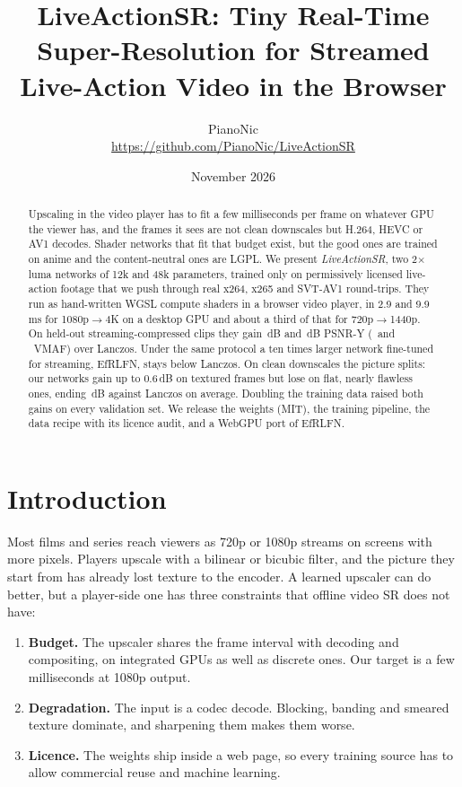 \documentclass[10pt,twocolumn,letterpaper]{article}
\title{\textbf{LiveActionSR: Tiny Real-Time Super-Resolution for Streamed Live-Action Video in the Browser}}
\author{PianoNic\\{\small\url{https://github.com/PianoNic/LiveActionSR}}}
\date{November 2026}
\begin{document}
\maketitle

\begin{abstract}
Upscaling in the video player has to fit a few milliseconds per frame on whatever GPU the viewer
has, and the frames it sees are not clean downscales but H.264, HEVC or AV1 decodes. Shader
networks that fit that budget exist, but the good ones are trained on anime and the
content-neutral ones are LGPL. We present \emph{LiveActionSR}, two 2$\times$ luma networks of
12k and 48k parameters, trained only on permissively licensed live-action footage that we push
through real x264, x265 and SVT-AV1 round-trips. They run as hand-written WGSL compute shaders in
a browser video player, in 2.9 and 9.9\,ms for 1080p$\to$4K on a desktop GPU and about a
third of that for 720p$\to$1440p. On held-out streaming-compressed clips they gain
\gainBalStream\,dB and \gainQualStream\,dB PSNR-Y (\vmafBalStream\ and \vmafQualStream\ VMAF) over
Lanczos. Under the same protocol a ten times larger network fine-tuned for streaming, EfRLFN, stays
below Lanczos. On clean downscales the picture splits: our networks gain up to
0.6\,dB on textured frames but lose on flat, nearly flawless ones, ending
\gainQualClean\,dB against Lanczos on average. Doubling the training data raised both gains on every
validation set. We release the weights (MIT), the training pipeline, the
data recipe with its licence audit, and a WebGPU port of EfRLFN.
\end{abstract}

\section{Introduction}

Most films and series reach viewers as 720p or 1080p streams on screens with more pixels.
Players upscale with a bilinear or bicubic filter, and the picture they start from has already
lost texture to the encoder. A learned upscaler can do better, but a player-side one has three
constraints that offline video SR does not have:

\begin{enumerate}
\setlength\itemsep{0pt}
\item \textbf{Budget.} The upscaler shares the frame interval with decoding and compositing, on
integrated GPUs as well as discrete ones. Our target is a few milliseconds at 1080p output.
\item \textbf{Degradation.} The input is a codec decode. Blocking, banding and smeared texture
dominate, and sharpening them makes them worse.
\item \textbf{Licence.} The weights ship inside a web page, so every training source has to allow
commercial reuse and machine learning.
\end{enumerate}
\end{document}
